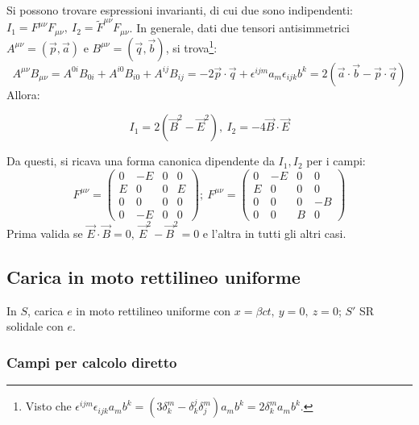 \documentclass[10pt, a4paper]{scrartcl}
\numberwithin{equation}{subsection}
\theoremstyle{style1}
\newenvironment{boxenv}[1][]{
    \begin{eqbox}[#1]
    }{
   \end{eqbox}
}
\begin{document}
Si possono trovare espressioni invarianti, di cui due sono indipendenti: $I_1= F^{\mu \nu } F_{\mu \nu } , \ I_2 = \widetilde{F }^{\mu \nu } F_{\mu \nu } $. In generale, dati due tensori antisimmetrici $A^{\mu \nu } = (\vec{p},\vec{a})$ e $B^{\mu \nu } = (\vec{q},\vec{b})$, si trova\footnote{Visto che $\epsilon ^{ijm}\epsilon _{ijk}a_m b^k =  (3\delta ^m _k - \delta ^j_k\delta ^m_j)  a_mb^k = 2\delta ^m_k a_mb^k$.}:
\[
A^{\mu \nu } B_{\mu \nu } = A^{0i} B_{0i} + A^{i 0}B_{i 0} + A^{ij} B_{ij} = - 2 \vec{p} \cdot \vec{q} + \epsilon^{ijm}a_m \epsilon _{ijk} b^k  = 2(\vec{a}\cdot \vec{b}-\vec{p}\cdot \vec{q})
\] 
Allora:
\begin{boxenv}[]
\begin{equation}
	I_1= 2 (\vec{B}^2 - \vec{E}^2 ), \ I_2 = -4 \vec{B}\cdot \vec{E}
\end{equation}
\end{boxenv}
\noindent Da questi, si ricava una forma canonica dipendente da $I_1,I_2$ per i campi:
\begin{equation}
	F^{\mu \nu } = \begin{pmatrix} 0 & - E & 0 &0 \\ E & 0 & 0 & E \\ 0&0&0&0\\ 0&-E&0 &0 \end{pmatrix} ; \ F^{\mu \nu } = \begin{pmatrix} 0 & - E & 0 &0 \\ E &0 &0 &0 \\ 0&0&0&-B \\ 0&0&B&0 \end{pmatrix} 
\end{equation}
Prima valida se $\vec{E}\cdot \vec{B}=0,\ \vec{E}^2- \vec{B}^2 =0$ e l'altra in tutti gli altri casi.
\subsection{Carica in moto rettilineo uniforme}

In $S$, carica $e$ in moto rettilineo uniforme con $x=\beta ct,\ y=0,\ z=0$; $S'$ SR solidale con $e$.

\subsubsection{Campi per calcolo diretto}
\end{document}
